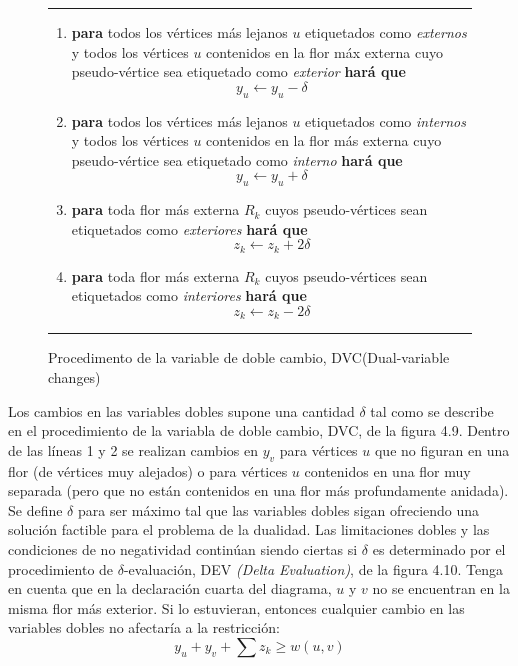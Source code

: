 \documentclass[10pt,a5paper]{book}
\begin{document}
\begin{figure}[H]
\caption{Procedimento de la variable de doble cambio, DVC(Dual-variable changes)}
\hrule
\begin{enumerate}
\item \textbf{para} todos los vértices más lejanos $u$ etiquetados como \emph{externos} y todos los vértices $u$ contenidos en la flor máx externa cuyo pseudo-vértice sea etiquetado como \emph{exterior} \textbf{hará que}
\[ y_u \leftarrow y_u - \delta \]
\item \textbf{para} todos los vértices más lejanos $u$ etiquetados como \emph{internos} y todos los vértices $u$ contenidos en la flor más externa cuyo pseudo-vértice sea etiquetado como \emph{interno} \textbf{hará que}
\[ y_u \leftarrow y_u + \delta \]
\item \textbf{para} toda flor más externa $R_k$ cuyos pseudo-vértices sean etiquetados como \emph{exteriores} \textbf{hará que}
\[ z_k \leftarrow z_k + 2\delta \]
\item \textbf{para} toda flor más externa $R_k$ cuyos pseudo-vértices sean etiquetados como \emph{interiores} \textbf{hará que}
\[ z_k \leftarrow z_k - 2\delta \] 
\end{enumerate}
\hrule
\end{figure}


Los cambios en las variables dobles supone una cantidad $\delta$ tal como se describe en el procedimiento de la variabla de doble cambio, DVC, de la figura 4.9. Dentro de las líneas 1 y 2 se realizan cambios en $y_v$ para vértices $u$ que no figuran en una flor (de vértices muy alejados) o para vértices $u$ contenidos en una flor muy separada (pero que no están contenidos en una flor más profundamente anidada). Se define $\delta$ para ser máximo tal que las variables dobles sigan ofreciendo una solución factible para el problema de la dualidad. Las limitaciones dobles y las condiciones de no negatividad continúan siendo ciertas si $\delta$ es determinado por el procedimiento de $\delta$-evaluación, DEV \emph{(Delta Evaluation)}, de la figura 4.10. Tenga en cuenta que en la declaración cuarta del diagrama, $u$ y $v$ no se encuentran en la misma flor más exterior. Si lo estuvieran, entonces cualquier cambio en las variables dobles no afectaría a la restricción:
\[y_u + y_v + \sum z_k \ge w(u,v) \]
\end{document}
